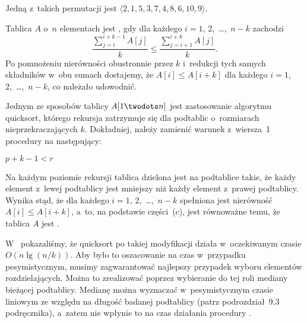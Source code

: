 \subproblem %
Jedną z~takich permutacji jest $\langle2,1,5,3,7,4,8,6,10,9\rangle$.

\subproblem %
Tablica $A$ o~$n$ elementach jest , gdy dla każdego $i=1$, 2,~\dots,~$n-k$ zachodzi
\[
	\frac{\sum_{j=i}^{i+k-1}A[j]}{k} \le \frac{\sum_{j=i+1}^{i+k}A[j]}{k}.
\]
Po pomnożeniu nierówności obustronnie przez $k$ i~redukcji tych samych składników w~obu sumach dostajemy, że $A[i]\le A[i+k]$ dla każdego $i=1$, 2,~\dots,~$n-k$, co należało udowodnić.

\subproblem %
Jednym ze sposobów  tablicy $A[1\twodots n]$ jest zastosowanie algorytmu quicksort, którego rekursja zatrzymuje się dla podtablic o~rozmiarach nieprzekraczających $k$. Dokładniej, należy zamienić warunek z~wiersza~1 procedury  na następujący:
\begin{codebox}
\li	\If $p+k-1<r$
\end{codebox}
Na każdym poziomie rekursji tablica dzielona jest na podtablice takie, że każdy element z~lewej podtablicy jest mniejszy niż każdy element z~prawej podtablicy. Wynika stąd, że dla każdego $i=1$, 2,~\dots,~$n-k$ spełniona jest nierówność $A[i]\le A[i+k]$, a~to, na podstawie części~(c), jest równoważne temu, że tablica $A$ jest .

W~ pokazaliśmy, że quicksort po takiej modyfikacji działa w~oczekiwanym czasie $O(n\lg(n/k))$. Aby było to oszacowanie na czas w~przypadku pesymistycznym, musimy zagwarantować najlepszy przypadek wyboru elementów rozdzielających. Można to zrealizować poprzez wybieranie do tej roli mediany bieżącej podtablicy. Medianę można wyznaczać w~pesymistycznym czasie liniowym ze względu na długość badanej podtablicy (patrz podrozdział~9.3 podręcznika), a~zatem nie wpłynie to na czas działania procedury .

